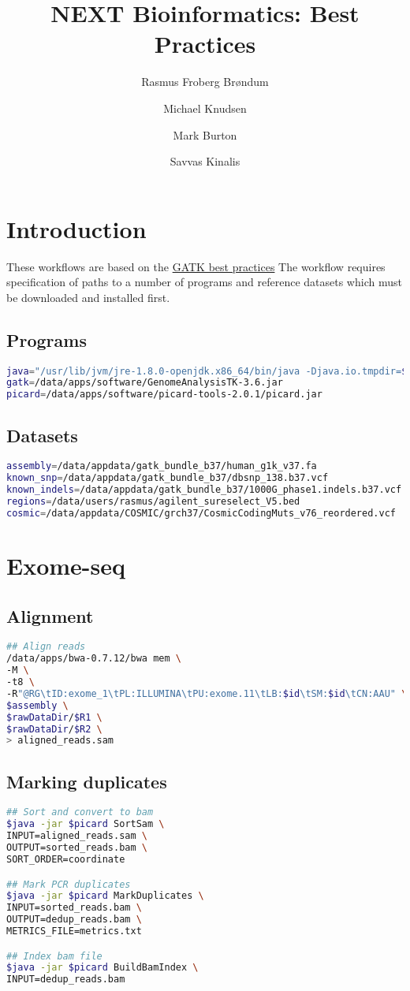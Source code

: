\documentclass[10pt, a4paper]{report}
\title{NEXT Bioinformatics: Best Practices}
\author[1]{Rasmus Froberg Br\o ndum}
\author[2]{Michael Knudsen}
\author[3]{Mark Burton}
\author[4]{Savvas Kinalis}
\affil[1]{Department of Haematology, Aalborg University Hospital}
\affil[2]{MOMA}
\affil[3]{SDU}
\affil[4]{Rigshospitalet}
\begin{document}
\maketitle
\chapter{Introduction}
These workflows are based on the \href{https://software.broadinstitute.org/gatk/best-practices/}{GATK best practices}
The workflow requires specification of paths to a number of programs and reference datasets which must be downloaded and installed first.
\section{Programs}
\begin{lstlisting}[language=bash]
java="/usr/lib/jvm/jre-1.8.0-openjdk.x86_64/bin/java -Djava.io.tmpdir=$TMPDIR" 
gatk=/data/apps/software/GenomeAnalysisTK-3.6.jar
picard=/data/apps/software/picard-tools-2.0.1/picard.jar
\end{lstlisting}

\section{Datasets}
\begin{lstlisting}[language=bash]
assembly=/data/appdata/gatk_bundle_b37/human_g1k_v37.fa
known_snp=/data/appdata/gatk_bundle_b37/dbsnp_138.b37.vcf
known_indels=/data/appdata/gatk_bundle_b37/1000G_phase1.indels.b37.vcf
regions=/data/users/rasmus/agilent_sureselect_V5.bed
cosmic=/data/appdata/COSMIC/grch37/CosmicCodingMuts_v76_reordered.vcf
\end{lstlisting}


\chapter{Exome-seq}
\section{Alignment}

\begin{lstlisting}[language=bash]
## Align reads
/data/apps/bwa-0.7.12/bwa mem \
-M \
-t8 \
-R"@RG\tID:exome_1\tPL:ILLUMINA\tPU:exome.11\tLB:$id\tSM:$id\tCN:AAU" \
$assembly \
$rawDataDir/$R1 \
$rawDataDir/$R2 \
> aligned_reads.sam
\end{lstlisting}

\section{Marking duplicates}
\begin{lstlisting}[language=bash]
## Sort and convert to bam
$java -jar $picard SortSam \
INPUT=aligned_reads.sam \
OUTPUT=sorted_reads.bam \
SORT_ORDER=coordinate

## Mark PCR duplicates
$java -jar $picard MarkDuplicates \
INPUT=sorted_reads.bam \
OUTPUT=dedup_reads.bam \
METRICS_FILE=metrics.txt

## Index bam file
$java -jar $picard BuildBamIndex \
INPUT=dedup_reads.bam
\end{lstlisting}
\end{document}
